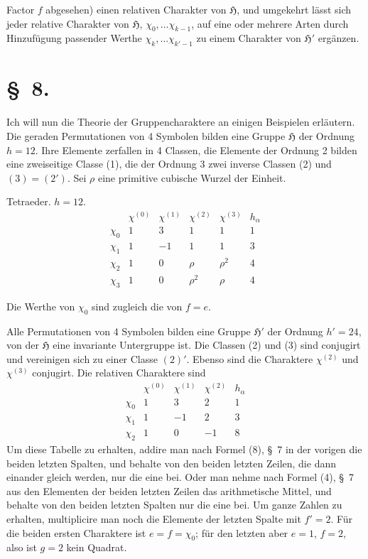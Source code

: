 \documentclass[11pt]{article}
\newcommand{\grp}{\mathfrak{H}}
\begin{document}
Factor $f$ abgesehen) einen relativen Charakter von $\grp$, und umgekehrt lässt sich jeder relative Charakter von $\grp$, $\chi_0,\ldots \chi_{k-1}$, auf eine oder mehrere Arten durch Hinzufügung passender Werthe $\chi_k,\ldots \chi_{k'-1}$ zu einem Charakter von $\grp'$ ergänzen.

\section*{\S~8.}

Ich will nun die Theorie der Gruppencharaktere an einigen Beispielen erläutern. Die geraden Permutationen von 4 Symbolen bilden eine Gruppe $\grp$ der Ordnung $h=12$. Ihre Elemente zerfallen in 4 Classen, die Elemente der Ordnung 2 bilden eine zweiseitige Classe (1), die der Ordnung 3 zwei inverse Classen (2) und $(3)=(2')$. Sei $\rho$ eine primitive cubische Wurzel der Einheit.

\begin{center}
Tetraeder. $h=12$.
\[
\begin{array}{c|rrrr|r}
 & \chi^{(0)} & \chi^{(1)} & \chi^{(2)} & \chi^{(3)} & h_\alpha\\ \hline
\chi_0 & 1 & 3 & 1 & 1 & 1\\
\chi_1 & 1 & -1 & 1 & 1 & 3\\
\chi_2 & 1 & 0 & \rho & \rho^2 & 4\\
\chi_3 & 1 & 0 & \rho^2 & \rho & 4
\end{array}
\]
\end{center}

Die Werthe von $\chi_0$ sind zugleich die von $f=e$.

Alle Permutationen von 4 Symbolen bilden eine Gruppe $\grp'$ der Ordnung $h'=24$, von der $\grp$ eine invariante Untergruppe ist. Die Classen (2) und (3) sind conjugirt und vereinigen sich zu einer Classe $(2)'$. Ebenso sind die Charaktere $\chi^{(2)}$ und $\chi^{(3)}$ conjugirt. Die relativen Charaktere sind
\[
\begin{array}{c|rrr|r}
 & \chi^{(0)} & \chi^{(1)} & \chi^{(2)} & h_\alpha\\ \hline
\chi_0 & 1 & 3 & 2 & 1\\
\chi_1 & 1 & -1 & 2 & 3\\
\chi_2 & 1 & 0 & -1 & 8
\end{array}
\]
Um diese Tabelle zu erhalten, addire man nach Formel (8), \S~7 in der vorigen die beiden letzten Spalten, und behalte von den beiden letzten Zeilen, die dann einander gleich werden, nur die eine bei. Oder man nehme nach Formel (4), \S~7 aus den Elementen der beiden letzten Zeilen das arithmetische Mittel, und behalte von den beiden letzten Spalten nur die eine bei. Um ganze Zahlen zu erhalten, multiplicire man noch die Elemente der letzten Spalte mit $f'=2$. Für die beiden ersten Charaktere ist $e=f=\chi_0$; für den letzten aber $e=1$, $f=2$, also ist $g=2$ kein Quadrat.
\end{document}
